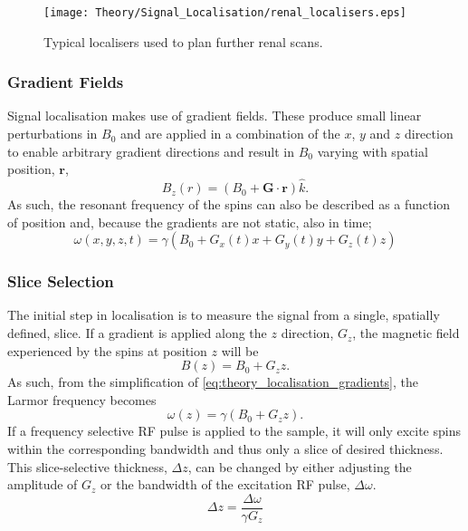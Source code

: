 \begin{figure}[H]
	\centering
	\texttt{[image: Theory/Signal\_Localisation/renal\_localisers.eps]}
	\caption{Typical localisers used to plan further renal scans.}
	\label{fig:theory_renal_localisers}	
\end{figure}
\subsubsection{Gradient Fields}
Signal localisation makes use of gradient fields. These produce small linear perturbations in $B_0$ and are applied in a combination of the $x$, $y$ and $z$ direction to enable arbitrary gradient directions and result in $B_0$ varying with spatial position, $\mathbf{r}$,
\begin{equation}
B_z\left( r\right) =\left( B_0 + \mathbf{G \cdot r}\right) \hat{k}.
\end{equation}
As such, the resonant frequency of the spins can also be described as a function of position and, because the gradients are not static, also in time;
\begin{equation}
\omega\left( x, y, z, t \right) = \gamma \left( B_0 + G_x(t)x + G_y(t)y + G_z(t)z \right) 
\label{eq:theory_localisation_gradients}
\end{equation}

\subsubsection{Slice Selection}
The initial step in localisation is to measure the signal from a single, spatially defined, slice. If a gradient is applied along the $z$ direction, $G_z$, the magnetic field experienced by the spins at position $z$ will be
\begin{equation}
B\left( z\right)  = B_0 + G_zz.
\end{equation}
As such, from the simplification of \eqref{eq:theory_localisation_gradients}, the Larmor frequency becomes
\begin{equation}
\omega\left( z\right)  = \gamma\left( B_0 + G_zz\right).
\end{equation}
If a frequency selective \ac{RF} pulse is applied to the sample, it will only excite spins within the corresponding bandwidth and thus only a slice of desired thickness. This slice-selective thickness, $\Delta z$, can be changed by either adjusting the amplitude of $G_z$ or the bandwidth of the excitation \ac{RF} pulse, $\Delta \omega$.
\begin{equation}
\Delta z = \frac{\Delta \omega}{\gamma G_z}
\end{equation}

